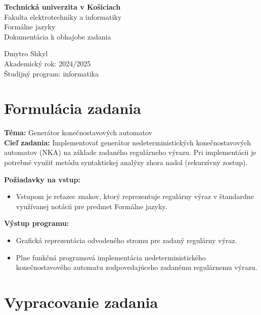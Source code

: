 \documentclass[a4paper,12pt]{article}
\begin{document}
\begin{titlepage}
    \centering
    \vspace*{1cm}
    \Large{\textbf{Technická univerzita v Košiciach}\\
    Fakulta elektrotechniky a informatiky}\\
    \vfill
    \large{Formálne jazyky}\\
    \large{Dokumentácia k obhajobe zadania}
    \vfill
    \begin{flushleft}
        Dmytro Shkyl\\
        Akademický rok: 2024/2025\\
        Študijný program: informatika
    \end{flushleft}
\end{titlepage}

\tableofcontents
\newpage
\section{Formulácia zadania}

\indent\textbf{Téma:} Generátor konečnostavových automatov\\

\noindent\textbf{Cieľ zadania:} Implementovať generátor nedeterministických konečnostavových automatov (NKA) na základe zadaného regulárneho výrazu. Pri implementácii je potrebné využiť metódu syntaktickej analýzy zhora nadol (rekurzívny zostup).

\vspace{1em}
\textbf{Požiadavky na vstup:}
\begin{itemize}
    \item Vstupom je reťazec znakov, ktorý reprezentuje regulárny výraz v štandardne využívanej notácii pre predmet Formálne jazyky.
\end{itemize}

\vspace{1em}
\textbf{Výstup programu:}
\begin{itemize}
    \item Grafická reprezentácia odvodeného stromu pre zadaný regulárny výraz. 
    \item Plne funkčná programová implementácia nedeterministického konečnostavového automatu zodpovedajúceho zadanému regulárnemu výrazu.
\end{itemize}
\newpage
\section{Vypracovanie zadania}
\end{document}
